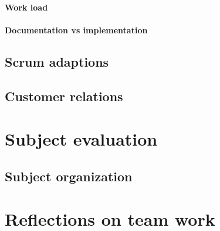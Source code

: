 \documentclass[11pt,a4paper,titlepage,oneside]{report}
\begin{document}
\paragraph{Work load}
\paragraph{Documentation vs implementation}
\subsection{Scrum adaptions}
\subsection{Customer relations}
\section{Subject evaluation}
\subsection{Subject organization}
\section{Reflections on team work}



\begin{flushleft}
	
\end{flushleft}

\appendix
\end{document}

